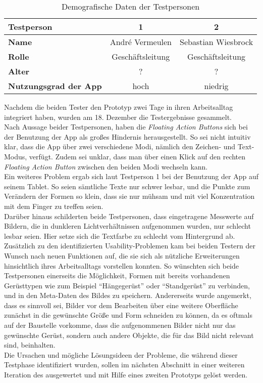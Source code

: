 \begin{table}[h]
  \centering
  \begin{tabular}{l | c | c}
    \hline
    \textbf{Testperson} & \textbf{1} & \textbf{2} \\
    \hline
    \textbf{Name} & André Vermeulen & Sebastian Wiesbrock \\
    \hline
    \textbf{Rolle} & Geschäftsleitung & Geschäftsleitung \\
    \hline
    \textbf{Alter} & ? & ? \\
    \hline
    \textbf{Nutzungsgrad der App} & hoch & niedrig \\
    \hline
  \end{tabular}
  \caption{Demografische Daten der Testpersonen}
  \label{table:testers}
\end{table}

Nachdem die beiden Tester den Prototyp zwei Tage in ihren Arbeitsalltag integriert haben, wurden am 18. Dezember die Testergebnisse gesammelt. \\

Nach Aussage beider Testpersonen, haben die \emph{Floating Action Buttons} sich bei der Benutzung der App als großes Hindernis herausgestellt.
So sei nicht intuitiv klar, dass die App über zwei verschiedene Modi, nämlich den Zeichen- und Text-Modus, verfügt.
Zudem sei unklar, dass man über einen Klick auf den rechten \emph{Floating Action Button} zwischen den beiden Modi wechseln kann. \\

Ein weiteres Problem ergab sich laut Testperson 1 bei der Benutzung der App auf seinem Tablet.
So seien sämtliche Texte nur schwer lesbar, und die Punkte zum Verändern der Formen so klein, dass sie nur mühsam und mit viel Konzentration mit dem Finger zu treffen seien. \\

Darüber hinaus schilderten beide Testpersonen, dass eingetragene Messwerte auf Bildern, die in dunkleren Lichtverhältnissen aufgenommen wurden, nur schlecht lesbar seien.
Hier setze sich die Textfarbe zu schlecht vom Hintergrund ab. \\

Zusätzlich zu den identifizierten Usability-Problemen kam bei beiden Testern der Wunsch nach neuen Funktionen auf, die sie sich als nützliche Erweiterungen hinsichtlich ihres Arbeitsalltags vorstellen konnten.
So wünschten sich beide Testpersonen einerseits die Möglichkeit, Formen mit bereits vorhandenen Gerüsttypen wie zum Beispiel ``Hängegerüst'' oder ``Standgerüst'' zu verbinden, und in den Meta-Daten des Bildes zu speichern.
Andererseits wurde angemerkt, dass es sinnvoll sei, Bilder vor dem Bearbeiten über eine weitere Oberfläche zunächst in die gewünschte Größe und Form schneiden zu können, da es oftmals auf der Baustelle vorkomme, dass die aufgenommenen Bilder nicht nur das gewünschte Gerüst, sondern auch andere Objekte, die für das Bild nicht relevant sind, beinhalten. \\

Die Ursachen und mögliche Lösungsideen der Probleme, die während dieser Testphase identifiziert wurden, sollen im nächsten Abschnitt in einer weiteren Iteration des \hcdp{} ausgewertet und mit Hilfe eines zweiten Prototyps gelöst werden.
